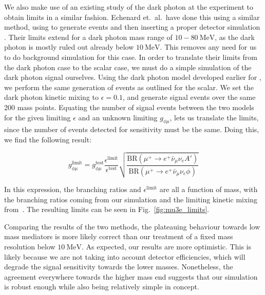 We also make use of an existing study of the dark photon at the \mueee experiment to obtain limits in a similar fashion.
Echenard et.\ al.\ have done this using a similar method, using \madgraph to generate events and then inserting a proper detector simulation \cite{Echenard:2014lma}.
Their limits extend for a dark photon mass range of $10 - 80~\textrm{MeV}$, as the dark photon is mostly ruled out already below $10~\textrm{MeV}$.
This removes any need for us to do background simulation for this case.
In order to translate their limits from the dark photon case to the scalar case, we must do a simple simulation of the dark photon signal ourselves.
Using the dark photon model developed earlier for \madgraph, we perform the same generation of events as outlined for the scalar.
We set the dark photon kinetic mixing to $\epsilon = 0.1$, and generate signal events over the same 200 mass points.
Equating the number of signal events between the two models for the given limiting $\epsilon$ and an unknown limiting $g_{\phi\mu}$, lets us translate the limits, since the number of events detected for sensitivity must be the same.
Doing this, we find the following result:

\begin{equation}
    g_{\phi\mu}^\textrm{limit} = g_{\phi\mu}^\textrm{test} \frac{\epsilon^\textrm{limit}}{\epsilon^\textrm{test}}\sqrt{\frac{\textrm{BR}(\mu^+ \rightarrow e^+ \bar{\nu}_\mu \nu_e A')}{\textrm{BR}(\mu^+ \rightarrow e^+ \bar{\nu}_\mu \nu_e \phi)}}
    \label{eqn:gphi_limit_echenard}
\end{equation}

\noindent In this expression, the branching ratios and $\epsilon^\textrm{limit}$ are all a function of mass, with the branching ratios coming from our simulation and the limiting kinetic mixing from~\cite{Echenard:2014lma}.
The resulting limits can be seen in Fig.~\ref{fig:mu3e_limits}.

Comparing the results of the two methods, the plateauing behaviour towards low mass mediators is more likely correct than our treatment of a fixed mass resolution below $10~\textrm{MeV}$.
As expected, our results are more optimistic.
This is likely because we are not taking into account detector efficiencies, which will degrade the signal sensitivity towards the lower masses.
Nonetheless, the agreement everywhere towards the higher mass end suggests that our simulation is robust enough while also being relatively simple in concept.
